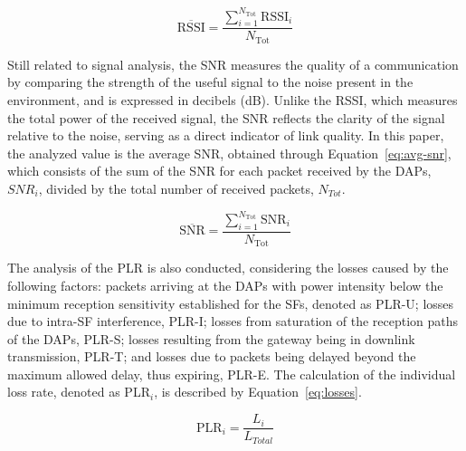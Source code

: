 \documentclass[a4paper,fleqn]{cas-dc}
\begin{document}
\begin{equation} \label{eq:avg-rssi}
    \overline{\text{RSSI}} = \frac{\sum\limits_{i=1}^{N_{\text{Tot}}} \text{RSSI}_{i}}{N_{\text{Tot}}}
\end{equation}

Still related to signal analysis, the \gls{SNR} measures the quality of a communication by comparing the strength of the useful signal to the noise present in the environment, and is expressed in decibels (dB). Unlike the \gls{RSSI}, which measures the total power of the received signal, the \gls{SNR} reflects the clarity of the signal relative to the noise, serving as a direct indicator of link quality. In this paper, the analyzed value is the average \gls{SNR}, obtained through Equation~\ref{eq:avg-snr}, which consists of the sum of the \gls{SNR} for each packet received by the \gls{DAPs}, \( SNR_{i} \), divided by the total number of received packets, \( N_{Tot} \).

\begin{equation} \label{eq:avg-snr}
    \overline{\text{SNR}} = \frac{\sum\limits_{i=1}^{N_{\text{Tot}}} \text{SNR}_{i}}{N_{\text{Tot}}}
\end{equation}

The analysis of the \gls{PLR} is also conducted, considering the losses caused by the following factors: packets arriving at the \gls{DAPs} with power intensity below the minimum reception sensitivity established for the SFs, denoted as PLR-U; losses due to intra-\gls{SF} interference, PLR-I; losses from saturation of the reception paths of the \gls{DAPs}, PLR-S; losses resulting from the gateway being in downlink transmission, PLR-T; and losses due to packets being delayed beyond the maximum allowed delay, thus expiring, PLR-E. The calculation of the individual loss rate, denoted as PLR$_{i}$, is described by Equation~\ref{eq:losses}.

\begin{equation} \label{eq:losses}
    \text{PLR}_{i} = \frac {L_{i}} {L_{Total}}
\end{equation}
\end{document}
